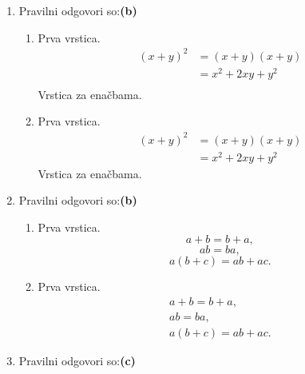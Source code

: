 \documentclass[11pt]{article}
\begin{document}
\begin{enumerate}
    \item Pravilni odgovori so:\textbf{(b)}%
    \begin{enumerate}
        \item Prva vrstica.
\begin{align*}
  (x + y)^2 &= (x + y)(x + y) \\
  &= x^2 + 2 x y + y^2 \\
\end{align*}
        Vrstica za enačbama.
        \item Prva vrstica.
\begin{align*}
  (x + y)^2 &= (x + y)(x + y) \\
  &= x^2 + 2 x y + y^2
\end{align*}
        Vrstica za enačbama.
    \end{enumerate}

    \item Pravilni odgovori so:\textbf{(b)}%
    \begin{enumerate}
        \item Prva vrstica.
\[ a + b = b + a, \]
\[ a b = b a, \]
\[ a (b + c) = a b + a c. \]
        \item Prva vrstica.
\begin{gather*}
  a + b = b + a, \\
  a b = b a, \\
  a (b + c) = a b + a c.
\end{gather*}
    \end{enumerate}

    \item Pravilni odgovori so:\textbf{(c)}%

\end{enumerate}
\end{document}
